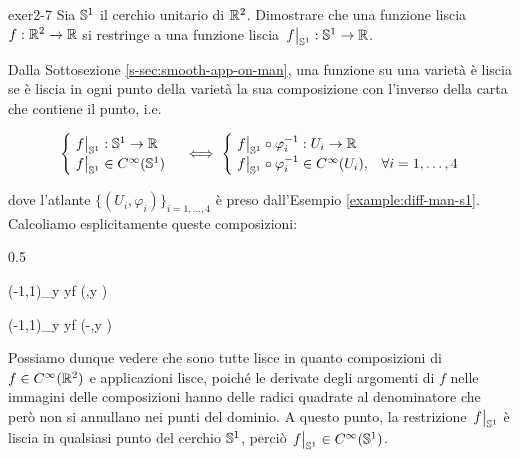 
{exer2-7}
{
Sia $ \S^{1} $ il cerchio unitario di $ \R^{2} $. Dimostrare che una funzione liscia $ f : \R^{2} \to \R $ si restringe a una funzione liscia $ \eval{f}_{\S^{1}} : \S^{1} \to \R $.
}
{
Dalla Sottosezione \ref{s-sec:smooth-app-on-man}, una funzione su una varietà è liscia se è liscia in ogni punto della varietà la sua composizione con l'inverso della carta che contiene il punto, i.e.

\begin{equation}
	\begin{cases}
		\eval{f}_{\S^{1}} : \S^{1} \to \R \\
		\eval{f}_{\S^{1}} \in C^{\infty}(\S^{1})
	\end{cases} %
	\iff %
	\begin{cases}
		\eval{f}_{\S^{1}} \circ \varphi_{i}^{-1} : U_{i} \to \R \\
		\eval{f}_{\S^{1}} \circ \varphi_{i}^{-1} \in C^{\infty}(U_{i}), & \forall i=1,\dots,4
	\end{cases}
\end{equation}

dove l'atlante $ \{(U_{i},\varphi_{i})\}_{i=1,\dots,4} $ è preso dall'Esempio \ref{example:diff-man-s1}. \\
Calcoliamo esplicitamente queste composizioni:

	{0.5}{%
				{(-1,1)_{y}}{\R}
				{y}{f \left(,y \right)}
			
				{(-1,1)_{y}}{\R}
				{y}{f \left(-,y \right)}
			}

Possiamo dunque vedere che sono tutte lisce in quanto composizioni di $ f \in C^{\infty}(\R^{2}) $ e applicazioni lisce, poiché le derivate degli argomenti di $ f $ nelle immagini delle composizioni hanno delle radici quadrate al denominatore che però non si annullano nei punti del dominio. A questo punto, la restrizione $ \eval{f}_{\S^{1}} $ è liscia in qualsiasi punto del cerchio $ \S^{1} $, perciò $ \eval{f}_{\S^{1}} \in C^{\infty}(\S^{1}) $.

}
